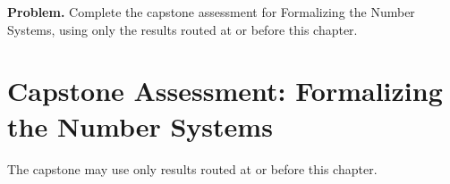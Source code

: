 \newpage
{}
\label{cap:formalizing-number-systems}

\begin{tcolorbox}[
  colback=gray!6,
  colframe=gray!40,
  arc=2pt,
  left=8pt, right=8pt, top=6pt, bottom=6pt,
  title={\small\textbf{Capstone Problem}},
  fonttitle=\small\bfseries
]
\textbf{Problem.}
Complete the capstone assessment for Formalizing the Number Systems, using only the results routed at or before this chapter.
\end{tcolorbox}

\section{Capstone Assessment: Formalizing the Number Systems}

\begin{remark*}
The capstone may use only results routed at or before this chapter.
\end{remark*}

\clearpage